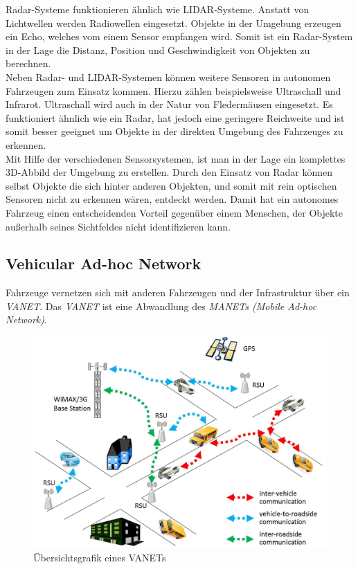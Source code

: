 Radar-Systeme \cite{introductionToRadarSystems} funktionieren ähnlich wie LIDAR-Systeme. Anstatt von Lichtwellen werden Radiowellen eingesetzt. Objekte in der Umgebung erzeugen ein Echo, welches vom einem Sensor empfangen wird. Somit ist ein Radar-System in der Lage die Distanz, Position und Geschwindigkeit von Objekten zu berechnen.\\

Neben Radar- und LIDAR-Systemen können weitere Sensoren in autonomen Fahrzeugen zum Einsatz kommen. Hierzu zählen beispielsweise Ultraschall und Infrarot.
Ultraschall wird auch in der Natur von Fledermäusen eingesetzt. Es funktioniert ähnlich wie ein Radar, hat jedoch eine geringere Reichweite und ist somit besser geeignet um Objekte in der direkten Umgebung des Fahrzeuges zu erkennen.\\

Mit Hilfe der verschiedenen Sensorsystemen, ist man in der Lage ein komplettes 3D-Abbild der Umgebung zu erstellen. Durch den Einsatz von Radar können selbst Objekte die sich hinter anderen Objekten, und somit mit rein optischen Sensoren nicht zu erkennen wären, entdeckt werden. Damit hat ein autonomes Fahrzeug einen entscheidenden Vorteil gegenüber einem Menschen, der Objekte außerhalb seines Sichtfeldes nicht identifizieren kann.\\

\subsection{Vehicular Ad-hoc Network}

Fahrzeuge vernetzen sich mit anderen Fahrzeugen und der Infrastruktur über ein \textit{VANET}. Das \textit{VANET} ist eine Abwandlung des \textit{MANETs (Mobile Ad-hoc Network)}. 

\begin{figure}[H]
    \centering
    \includegraphics[width=.485\textwidth]{resources/images/vanet.jpg}
    \caption{Übersichtsgrafik eines VANETs \cite{vanet}}
\end{figure}

